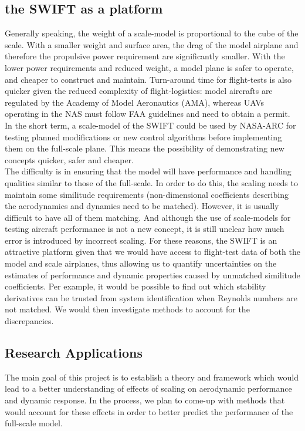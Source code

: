 \documentclass[titlepage,10pt]{article}
\begin{document}
\subsection{the SWIFT as a platform}
Generally speaking, the weight of a scale-model is proportional to the cube of the scale. With a smaller weight and surface area, the drag of the model airplane and therefore the propulsive power requirement are significantly smaller. With the lower power requirements and reduced weight, a model plane is safer to operate, and cheaper to construct and maintain. Turn-around time for flight-tests is also quicker given the reduced complexity of flight-logistics: model aircrafts are regulated by the Academy of Model Aeronautics (AMA), whereas UAVs operating in the NAS must follow FAA guidelines and need to obtain a permit.\\

In the short term, a scale-model of the SWIFT could be used by NASA-ARC for testing planned modifications or new control algorithms before implementing them on the full-scale plane. This means the possibility of demonstrating new concepts quicker, safer and cheaper. \\

\enlargethispage{2\baselineskip}
The difficulty is in ensuring that the model will have performance and handling qualities similar to those of the full-scale. In order to do this, the scaling needs to maintain some similitude requirements \cite{Wolowicz} (non-dimensional coefficients describing the aerodynamics and dynamics need to be matched). However, it is usually difficult to have all of them matching. And although the use of scale-models for testing aircraft performance is not a new concept, it is still unclear how much error is introduced by incorrect scaling. For these reasons, the SWIFT is an attractive platform given that we would have access to flight-test data of both the model and scale airplanes, thus allowing us to quantify uncertainties on the estimates of performance and dynamic properties caused by unmatched similitude coefficients. Per example, it would be possible to find out which stability derivatives can be trusted from system identification when Reynolds numbers are not matched. We would then investigate methods to account for the discrepancies.\\

\subsection{Research Applications}
The main goal of this project is to establish a theory and framework which would lead to a better understanding of effects of scaling on aerodynamic performance and dynamic response. In the process, we plan to come-up with methods that would account for these effects in order to better predict the performance of the full-scale model.\\
\end{document}
